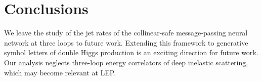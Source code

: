 \section{Conclusions}\label{sec:conclusions}

We leave the study of the jet rates of the collinear-safe
message-passing neural network at three loops to future work. Extending
this framework to generative symbol letters of double Higgs production
is an exciting direction for future work. Our analysis neglects
three-loop energy correlators of deep inelastic scattering, which may
become relevant at LEP.

